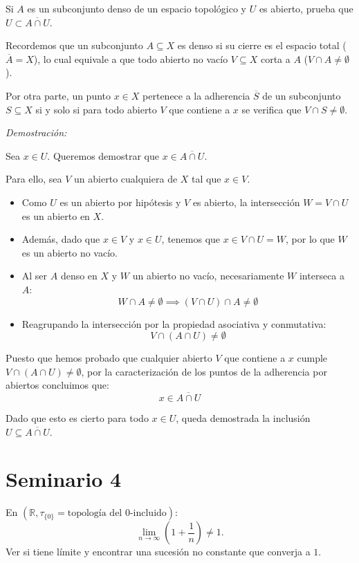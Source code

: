 \begin{ejer}
[57] Si $A$ es un subconjunto denso de un espacio topológico y $U$ es abierto, prueba que $U\subset \overline{A\cap U}$.
\end{ejer}
\begin{sol}
    Recordemos que un subconjunto $A \subseteq X$ es denso si su cierre es el espacio total ($\overline{A} = X$), lo cual equivale a que todo abierto no vacío $V \subseteq X$ corta a $A$ ($V \cap A \neq \emptyset$).

    Por otra parte, un punto $x \in X$ pertenece a la adherencia $\overline{S}$ de un subconjunto $S \subseteq X$ si y solo si para todo abierto $V$ que contiene a $x$ se verifica que $V \cap S \neq \emptyset$.

    \medskip

    \textit{Demostración:}

    Sea $x \in U$. Queremos demostrar que $x \in \overline{A \cap U}$.

    Para ello, sea $V$ un abierto cualquiera de $X$ tal que $x \in V$.
    \begin{itemize}
        \item Como $U$ es un abierto por hipótesis y $V$ es abierto, la intersección $W = V \cap U$ es un abierto en $X$.
        \item Además, dado que $x \in V$ y $x \in U$, tenemos que $x \in V \cap U = W$, por lo que $W$ es un abierto no vacío.
        \item Al ser $A$ denso en $X$ y $W$ un abierto no vacío, necesariamente $W$ interseca a $A$:
        \[
            W \cap A \neq \emptyset \implies (V \cap U) \cap A \neq \emptyset
        \]
        \item Reagrupando la intersección por la propiedad asociativa y conmutativa:
        \[
            V \cap (A \cap U) \neq \emptyset
        \]
    \end{itemize}

    Puesto que hemos probado que cualquier abierto $V$ que contiene a $x$ cumple $V \cap (A \cap U) \neq \emptyset$, por la caracterización de los puntos de la adherencia por abiertos concluimos que:
    \[
        x \in \overline{A \cap U}
    \]

    Dado que esto es cierto para todo $x \in U$, queda demostrada la inclusión $U \subseteq \overline{A \cap U}$.
\end{sol}

\section{Seminario 4}
\begin{ejer}[66]
En $(\mathbb{R}, \tau_{\{0\}} = \text{topología del } 0\text{-incluido})$:
\[
    \lim_{n \to \infty} \left(1 + \frac{1}{n}\right) \ne 1. \text{}
\]
Ver si tiene límite y encontrar una sucesión no constante que converja a $1$.
\end{ejer}

